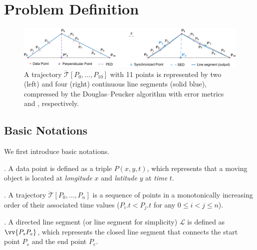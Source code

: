 \section{Problem Definition}	%
\label{sec-problem}


\begin{figure}[tb!]
	\centering
	\vspace{-1ex}
	\includegraphics[scale=0.66]{Figures/Fig-DP.png}
	\vspace{-2.5ex}
	\caption{\small A trajectory $\dddot{\mathcal{T}}[P_0, \ldots, P_{10}]$  with 11 points is represented by two (left) and four (right) continuous line segments (solid blue), compressed by the Douglas--Peucker algorithm \cite{Douglas:Peucker} with error metrics \ped and \sed, respectively.}
	\vspace{-3ex}
	\label{fig:notations}
\end{figure}



\subsection{Basic Notations}
\label{subsec-notation}

We first introduce basic notations.

. A data point is defined as a triple $P(x, y, t)$, which represents that a moving object is located at {\em longitude} $x$ and {\em latitude} $y$ at {\em time} $t$. 

. A trajectory $\dddot{\mathcal{T}}[P_0, \ldots, P_n]$ is a sequence of points in a monotonically increasing order of their associated time values (\ie $P_i.t < P_j.t$ for any $0\le i<j\le n$). 

. A directed line segment (or line segment for simplicity) $\mathcal{L}$ is defined as $\vv{P_{s}P_{e}}$, which represents the closed line segment that connects the start point $P_s$ and the end point $P_e$.

